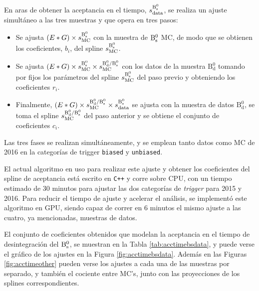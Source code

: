 En aras de obtener la aceptancia en el tiempo, $s_{\text{data}}^{\mathrm{B}{}_{\mathrm{s}}^{0}} $, se realiza un ajuste simultáneo a las tres muestras y que opera en tres pasos:
\begin{itemize}
  \item Se ajusta $(E*G) \times s_{\text{MC}}^{\mathrm{B}{}_{\mathrm{s}}^{0}}$  con la muestra de $\mathrm{B}{}_{\mathrm{s}}^{0}$ MC, de modo que se obtienen los coeficientes, $b_i$, del spline $s_{\text{MC}}^{\mathrm{B}{}_{\mathrm{s}}^{0}} $.
  \item Se ajusta $(E*G) \times s_{\text{MC}}^{\mathrm{B}{}_{\mathrm{s}}^{0}} \times s_{\text{MC}}^{\mathrm{B_d^0}/\mathrm{B}{}_{\mathrm{s}}^{0}} $ con los datos de la muestra $\mathrm{B_d^0}$ tomando por fijos los parámetros del spline $s_{\text{MC}}^{\mathrm{B}{}_{\mathrm{s}}^{0}} $ del paso previo y obteniendo los coeficientes $r_i$.
  \item Finalmente, $(E*G) \times s_{\text{MC}}^{\mathrm{B_d^0}/\mathrm{B}{}_{\mathrm{s}}^{0}} \times s_{\text{data}}^{\mathrm{B}{}_{\mathrm{s}}^{0}} $ se ajusta con la muestra de datos $\mathrm{B_d^0}$, se toma el spline $s_{\text{MC}}^{\mathrm{B_d^0}/\mathrm{B}{}_{\mathrm{s}}^{0}} $ del paso anterior y se obtiene el conjunto de coeficientes $c_i$.
\end{itemize}
%
Las tres fases se realizan simultáneamente, y se emplean tanto datos como MC de 2016 en la categorías de trigger \texttt{biased} y \texttt{unbiased}.


El actual algoritmo en uso para realizar este ajuste y obtener los coeficientes del spline de aceptancia está escrito en \texttt{C++} y corre sobre CPU, con un tiempo estimado de 30 minutos para ajustar las dos categorías de \textit{trigger} para 2015 y 2016. Para reducir el tiempo de ajuste y acelerar el análisis, se implementó este algoritmo en GPU, siendo capaz de correr en 6 minutos el mismo ajuste a las cuatro, ya mencionadas, muestras de datos.

El conjunto de coeficientes obtenidos que modelan la aceptancia en el tiempo de desintegración del $\mathrm{B}{}_{\mathrm{s}}^{0}$,
 se muestran en la Tabla \ref{tab:acctimebsdata}, y puede verse el gráfico de los ajustes en la Figura \ref{fig:acctimebsdata}. Además en las Figuras \ref{fig:acctimeother} pueden verse los ajustes a cada una de las muestras por separado, y también el cociente entre MC's, junto con las proyecciones de los splines correspondientes.


